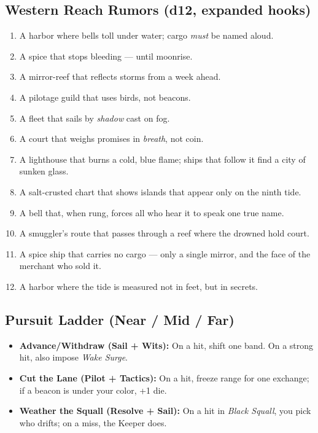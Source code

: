 \subsection*{Western Reach Rumors (d12, expanded hooks)}
\begin{enumerate}
\item A harbor where bells toll under water; cargo \emph{must} be named aloud.
\item A spice that stops bleeding --- until moonrise.
\item A mirror-reef that reflects storms from a week ahead.
\item A pilotage guild that uses birds, not beacons.
\item A fleet that sails by \emph{shadow} cast on fog.
\item A court that weighs promises in \emph{breath}, not coin.
\item A lighthouse that burns a cold, blue flame; ships that follow it find a city of sunken glass.
\item A salt-crusted chart that shows islands that appear only on the ninth tide.
\item A bell that, when rung, forces all who hear it to speak one true name.
\item A smuggler's route that passes through a reef where the drowned hold court.
\item A spice ship that carries no cargo --- only a single mirror, and the face of the merchant who sold it.
\item A harbor where the tide is measured not in feet, but in secrets.
\end{enumerate}

\subsection*{Pursuit Ladder (Near / Mid / Far)}
\begin{itemize}
\item \textbf{Advance/Withdraw (Sail + Wits):} On a hit, shift one band. On a strong hit, also impose \emph{Wake Surge}.
\item \textbf{Cut the Lane (Pilot + Tactics):} On a hit, freeze range for one exchange; if a beacon is under your color, +1 die.
\item \textbf{Weather the Squall (Resolve + Sail):} On a hit in \emph{Black Squall}, you pick who drifts; on a miss, the Keeper does.
\end{itemize}


